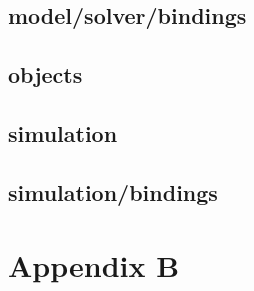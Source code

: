 \section{model/solver/bindings}

\section{objects}


\section{simulation}





\section{simulation/bindings}



\chapter{Appendix B}